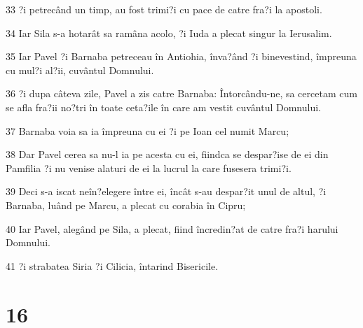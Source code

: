 \par 33 ?i petrecând un timp, au fost trimi?i cu pace de catre fra?i la apostoli.
\par 34 Iar Sila s-a hotarât sa ramâna acolo, ?i Iuda a plecat singur la Ierusalim.
\par 35 Iar Pavel ?i Barnaba petreceau în Antiohia, înva?ând ?i binevestind, împreuna cu mul?i al?ii, cuvântul Domnului.
\par 36 ?i dupa câteva zile, Pavel a zis catre Barnaba: Întorcându-ne, sa cercetam cum se afla fra?ii no?tri în toate ceta?ile în care am vestit cuvântul Domnului.
\par 37 Barnaba voia sa ia împreuna cu ei ?i pe Ioan cel numit Marcu;
\par 38 Dar Pavel cerea sa nu-l ia pe acesta cu ei, fiindca se despar?ise de ei din Pamfilia ?i nu venise alaturi de ei la lucrul la care fusesera trimi?i.
\par 39 Deci s-a iscat neîn?elegere între ei, încât s-au despar?it unul de altul, ?i Barnaba, luând pe Marcu, a plecat cu corabia în Cipru;
\par 40 Iar Pavel, alegând pe Sila, a plecat, fiind încredin?at de catre fra?i harului Domnului.
\par 41 ?i strabatea Siria ?i Cilicia, întarind Bisericile.

\chapter{16}


